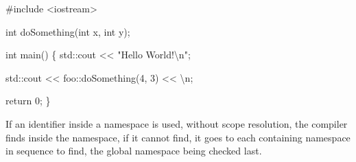 \documentclass[
  letterpaper,
  DIV=11,
  numbers=noendperiod]{scrreprt}
\newenvironment{Shaded}{\begin{snugshade}}{\end{snugshade}}
\newcommand{\CommentTok}[1]{\textcolor[rgb]{0.37,0.37,0.37}{#1}}
\newcommand{\DecValTok}[1]{\textcolor[rgb]{0.68,0.00,0.00}{#1}}
\newcommand{\ErrorTok}[1]{\textcolor[rgb]{0.68,0.00,0.00}{#1}}
\newcommand{\FunctionTok}[1]{\textcolor[rgb]{0.28,0.35,0.67}{#1}}
\newcommand{\NormalTok}[1]{\textcolor[rgb]{0.00,0.23,0.31}{#1}}
\newcommand{\SpecialCharTok}[1]{\textcolor[rgb]{0.37,0.37,0.37}{#1}}
\newcommand{\StringTok}[1]{\textcolor[rgb]{0.13,0.47,0.30}{#1}}
\begin{document}
\begin{Shaded}
\begin{Highlighting}[]
\CommentTok{\#include \textless{}iostream\textgreater{}}

\NormalTok{int }\FunctionTok{doSomething}\NormalTok{(int x, int y);}

\NormalTok{int }\FunctionTok{main}\NormalTok{()}
\NormalTok{\{}
\NormalTok{    std}\SpecialCharTok{::}\NormalTok{cout }\SpecialCharTok{\textless{}}\ErrorTok{\textless{}} \StringTok{"Hello World!}\SpecialCharTok{\textbackslash{}n}\StringTok{"}\NormalTok{;}

\NormalTok{    std}\SpecialCharTok{::}\NormalTok{cout }\SpecialCharTok{\textless{}}\ErrorTok{\textless{}}\NormalTok{ foo}\SpecialCharTok{::}\FunctionTok{doSomething}\NormalTok{(}\DecValTok{4}\NormalTok{, }\DecValTok{3}\NormalTok{) }\SpecialCharTok{\textless{}}\ErrorTok{\textless{}} \StringTok{\textquotesingle{}}\SpecialCharTok{\textbackslash{}n}\StringTok{\textquotesingle{}}\NormalTok{;}
    
\NormalTok{    return }\DecValTok{0}\NormalTok{;}
\NormalTok{\}}
\end{Highlighting}
\end{Shaded}

If an identifier inside a namespace is used, without scope resolution,
the compiler finds inside the namespace, if it cannot find, it goes to
each containing namespace in sequence to find, the global namespace
being checked last.
\end{document}
